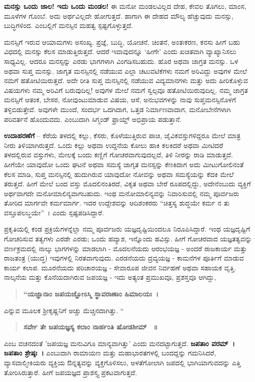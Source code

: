 {\textbf{ಮನಸ್ಸು ಒಂದು ಜಾಲ! ಇದು ಒಂದು ಮಂಡಲ!} ಈ ಮನೋ ಮಂಡಲವಿಲ್ಲದ ದೇಹ, ಕೇವಲ ತೊಗಲು, ಮಾಂಸ, ಮೂಳೆಗಳ ಗೊಂಬೆ. ಅದು ಅರ್ಥವಿಲ್ಲದೇ ಹೋಗುತ್ತದೆ. ಹಾಗಾಗಿ ಈ ದೇಹದ ಮೌಲ್ಯ ಹೆಚ್ಚುವುದು ಮನಸ್ಸು, ಬುದ್ಧಿಗಳಿಂದ. ಎಂಬಲ್ಲಿಗೆ ಮನಸ್ಸಿನ ಮಹತ್ವ ಸ್ಪಷ್ಟಗೊಳ್ಳುತ್ತದೆ.

ಮನಸ್ಸಿಗೆ ಇರುವ ಆಯಾಮಗಳು ಅಸಂಖ್ಯ. ಪ್ರಜ್ಞೆ, ಬುದ್ಧಿ, ಯೋಚನೆ, ಚಿಂತನೆ, ಅಂತಃಕರಣ, ಕನಸು ಹೀಗೆ ಬಹು ವಿಧದಲ್ಲಿ ಮನಸ್ಸು ಕೆಲಸ ಮಾಡುತ್ತಿರುತ್ತದೆ. ಆದರೆ ಇವಾವುದನ್ನೂ ‘ಹೀಗೇ’ ಎಂದು ಖಚಿತವಾಗಿ ವ್ಯಾಖ್ಯಾನಿಸಲು ಸಾಧ್ಯವಿಲ್ಲ. ಆದರೂ ಮನಸ್ಸನ್ನು ಎರಡು ಭಾಗಗಳಾಗಿ ವಿಂಗಡಿಸಬಹುದು. ಹೊರ ಅಥವಾ ಜಾಗ್ರತ ಮನಸ್ಸು. ಒಳ ಅಥವಾ ಸುಪ್ತ ಮನಸ್ಸು. ಜಾಗೃತ ಮನಸ್ಸಿನಲ್ಲಿ ನಡೆಯುವ ಎಲ್ಲಾ ಚಟುವಟಿಕೆಗಳು ನಮಗೆ ಅರಿವಿದ್ದು ಅವುಗಳ ಮೇಲೆ ನಮಗೆ ಹತೋಟಿಯಿರುತ್ತದೆ. ಅದೇ ರೀತಿ ಸುಪ್ತ ಮನಸ್ಸಿನಲ್ಲಿ ನಡೆಯುವ ವಿದ್ಯಮಾನಗಳು ಮತ್ತು ಅದು ಹೀರಿಕೊಳ್ಳುವ ವಿಷಯಗಳು ನಮ್ಮ ಅರಿವಿಗೆ ಬರುವುದಿಲ್ಲ! ಅವುಗಳ ಮೇಲೆ ನಮಗೆ ಸ್ವಲ್ಪವೂ ಹತೋಟಿಯಿರುವುದಿಲ್ಲ. ನಮ್ಮ ಜಾಗ್ರತ ಮನಸ್ಸಿಗೆ ಆತಂಕ, ಬೇಸರ, ನೋವುಂಟುಮಾಡುವ ವಿಷಯ, ಆಸೆ, ಅನುಭವಗಳನ್ನು ನಾವು ಸುಪ್ತಮನಸ್ಸಿನೊಳಗೆ ತಳ್ಳಿಬಿಡುತ್ತೇವೆ. ಅವುಗಳೇ ಮುಂದೆ, ಸಂದರ್ಭ ಒದಗಿದಾಗ, ಒತ್ತಡ ನಿರ್ಮಾಣವಾದಾಗ, ಮನೋಬೇನೆಗಳಾಗಿ ಪರಿವರ್ತನೆ ಹೊಂದುವದು. ಎಂಬುದಾಗಿ ಸಿಗ್ಮಂಡ್‌ ಫ್ರಾಯ್ಡ್ ಅಭಿಪ್ರಾಯ ಪಡುತ್ತಾನೆ.

\textbf{ಉದಾಹರಣೆಗೆ} – ಕೆರೆಯ ತಳದಲ್ಲಿ ಕಲ್ಲು, ಕೆಸರು, ಕೊಳೆಯುತ್ತಿರುವ ಪಾಚಿ, ಜೈವಿಕವಸ್ತುಗಳಿದ್ದರೂ ಮೇಲೆ ಮಾತ್ರ ನೀರು ತಿಳಿಯಾಗಿರುತ್ತದೆ. ಒಂದು ಕಲ್ಲು ಅಥವಾ ಉದ್ದನೆಯ ಕೋಲು ಹಾಕಿ ಕಲಕಿದರೆ ಅಥವಾ ಮೀಟಿದರೆ ತಳದಲ್ಲಿರುವ ವಸ್ತುಗಳು, ಮೇಲಕ್ಕೆ ಬಂದು ಕಣ್ಣಿಗೆ ಗೋಚರವಾಗುವುದಲ್ಲದೆ, ತಿಳಿ ನೀರನ್ನು ರಾಡಿ ಮಾಡುತ್ತದೆ. ಹೀಗೆಯೇ ಯಾವುದೋ ಒಂದು ಘಟನೆ ಅಥವಾ ಸಮಸ್ಯೆ ಜಾಗೃತ ಮನಸ್ಸನ್ನು ಕೆಣಕಿದಾಗ ಅದು ಮೀಟುಗೋಲಿನಂತೆ ಕೆಲಸ ಮಾಡಿ, ಸುಪ್ತ ಮನಸ್ಸಿನಲ್ಲಿ ಹುದುಗಿರುವ ಯಾವುದೋ ನೋವನ್ನು ಅಥವಾ ಸಮಸ್ಯೆಯನ್ನು ಕೆದಕಿ ಮೇಲೆ ತರುತ್ತದೆ. ಹೀಗೆ ಮೇಲೆ ಬಂದ ವಸ್ತು ಮೊದಲಿನಂತಿರದೆ, ವಿಕೃತ ಅಥವಾ ಬೇರೆ ರೂಪದಲ್ಲಿದ್ದು, ಅದೇನೆಂಬುದು ವ್ಯಕ್ತಿಗೆ ಅರ್ಥವಾಗದೇ ಮನೋಮಾಲಿನ್ಯವಾಗಬಹುದು. ಇಂಥ ಮನೋಮಾಲಿನ್ಯವನ್ನು ನಿವಾರಿಸುವಲ್ಲಿ ನಮ್ಮ ಪೂರ್ವಜರು ತೋರಿದ ಮಾರ್ಗವೇ ಕರ್ಮಮಾರ್ಗ. ಇದರ ಉದ್ದೇಶವನ್ನು ಆದಿಶಂಕರರು “ಚಿತ್ತಸ್ಯ ಶುದ್ಧಯೇ ಕರ್ಮ ನ ತು ವಸ್ತೂಪಲಬ್ಧಯೇ”~। ಎಂದು ಸ್ಪಷ್ಟಪಡಿಸಿದ್ದಾರೆ.

ಪ್ರಕೃತಿಯಲ್ಲಿ ಕಂಡ ಪ್ರಕ್ರಿಯೆಗಳನ್ನೆಲ್ಲಾ ನಮ್ಮ ಪೂರ್ವಜರು ಯಜ್ಞದೃಷ್ಟಿಯಿಂದಲೂ ನಿರೂಪಿಸಿದ್ದಾರೆ. ಇಂಥ ಯಜ್ಞದೃಷ್ಟಿಗೆ ಗೋಚರಿಸುವ ತತ್ವಗಳು ಎರಡೇ ಎರಡು; ಒಂದು ಹವ್ಯಾಶ, ಇನ್ನೊಂದು ಹವಿಸ್ಸು. ಹೀಗೆ ಗೋಚರವಾದ ಯಜ್ಞತತ್ವವನ್ನು ವರ್ಣಕ್ರಮದಲ್ಲಿ ನಾಲ್ಕು ಭಾಗಗಳನ್ನು ಮಾಡಲಾಗಿ - ಮೊದಲನೆಯದು ಆರಂಭಯಜ್ಞ - ಅಂದರೆ ರಾಜಕಾರ್ಯ ಮತ್ತು ರಾಜತಂತ್ರ (ಯುದ್ಧ) ಇವುಗಳಲ್ಲಿ ನಿರತವಾಗುವುದು. ಎರಡನೆಯದು ದ್ರವ್ಯಯಜ್ಞ - ಕಾಮನೆಗಳ ಪೂರ್ತಿಗೆ ಮಾಡುವ ಕಾರ್ಯ ಕಲಾಪ. ಮೂರನೆಯದು ಪರಿಚಾರಯಜ್ಞ - ಸೇವಾರೂಪ ಜೀವನ ನಿರ್ವಹಣೆ ಅಥವಾ ಸಹಾಯಕ ವೃತ್ತಿ. ನಾಲ್ಕನೆಯ ಮತ್ತು ಕೊನೆಯದಾಗಿರುವ ಜಪಯಜ್ಞ - ಇದು ಅತ್ಯಂತ ಪ್ರಮುಖವೂ, ಪ್ರಶಸ್ತವೂ ಆಗಿದ್ದು, 
\begin{verse}
\textbf{“ಯಜ್ಞಾನಾಂ ಜಪಯಜ್ಞೋಽಸ್ಮಿ ಸ್ಥಾವರಾಣಾಂ ಹಿಮಾಲಯಃ~। }
\end{verse}
ಎನ್ನುವ ಮೂಲಕ ಶ್ರೀಕೃಷ್ಣನಿಗೆ ಅಚ್ಚು ಮೆಚ್ಚಿನದಾಗಿತ್ತು. “ 
\begin{verse}
\textbf{ಸರ್ವೇ ತೇ ಜಪಯಜ್ಞಸ್ಯ ಕಲಾಂ ನಾರ್ಹಂತಿ ಷೋಡಶೀಮ್ ~॥}
\end{verse}
ಎಂಬ ವಚನದಂತೆ ’ಜಪಯಜ್ಞ ಮನುವಿಗೂ ಮಾನ್ಯವಾಗಿತ್ತು’ ಎಂದು ಮನದಟ್ಟಾಗುತ್ತದೆ. \textbf{ಜಪತಾಂ ವರಮ್~। ಜಪತಾಂ ಶ್ರೇಷ್ಠಃ~। } ಎಂಬುದಾಗಿ ರಾಮಾಯಣ ಮತ್ತು ಮಹಾಭಾರತಗಳಲ್ಲಿ ಬಂದದ್ದನ್ನು ಗಮನಿಸಿದರೆ, ವ್ಯಾಸವಾಲ್ಮೀಕಿಯರು ವ್ಯಕ್ತಿಯ ಔನ್ನತ್ಯವನ್ನು ವ್ಯಕ್ತಗೊಳಿಸಲು, ಅಳತೆಗೋಲಾಗಿ ಜಪದಲ್ಲಿ ಭಾಗಿಯಾಗುವದನ್ನು ಎತ್ತಿ ತೋರಿಸಿರುತ್ತಾರೆ. ಹೀಗೆ ಜಪಯಜ್ಞದ ಪ್ರಾಶಸ್ತ್ಯ ಪ್ರಕಟವಾಗುತ್ತದೆ.

}
